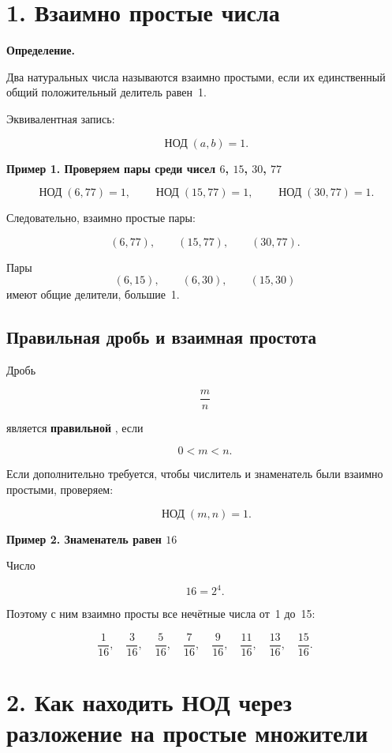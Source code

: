 \documentclass[a4paper,12pt]{article}
\newcommand{\mygcd}[2]{
  \mathop{\text{НОД}}\nolimits(#1,#2)
}
\newcommand{\term}[1]{
  \textbf{\textcolor{darkaccent}{#1}}
}
\newcommand{\exampletitle}[1]{
  \medskip
  \textbf{\textcolor{accent}{#1}}
  \par
  \smallskip
}
\begin{document}
\section*{1. Взаимно простые числа}

\term{Определение.}
Два натуральных числа называются взаимно простыми,
если их единственный общий положительный делитель равен~1.

Эквивалентная запись:

\[
\mygcd{a}{b}=1.
\]

\exampletitle{
Пример 1. Проверяем пары среди чисел
$6$, $15$, $30$, $77$
}

\[
\mygcd{6}{77}=1,
\qquad
\mygcd{15}{77}=1,
\qquad
\mygcd{30}{77}=1.
\]

Следовательно, взаимно простые пары:

\[
(6,77),
\qquad
(15,77),
\qquad
(30,77).
\]

Пары
\[
(6,15),\qquad (6,30),\qquad (15,30)
\]
имеют общие делители, большие~1.


\subsection*{Правильная дробь и взаимная простота}

Дробь

\[
\frac{m}{n}
\]

является \term{правильной}, если

\[
0<m<n.
\]

Если дополнительно требуется,
чтобы числитель и знаменатель были взаимно простыми,
проверяем:

\[
\mygcd{m}{n}=1.
\]

\exampletitle{
Пример 2. Знаменатель равен $16$
}

Число

\[
16=2^4.
\]

Поэтому с ним взаимно просты все нечётные числа
от~1 до~15:

\[
\frac1{16},
\quad
\frac3{16},
\quad
\frac5{16},
\quad
\frac7{16},
\quad
\frac9{16},
\quad
\frac{11}{16},
\quad
\frac{13}{16},
\quad
\frac{15}{16}.
\]


\section*{2. Как находить НОД через разложение на простые множители}
\end{document}
